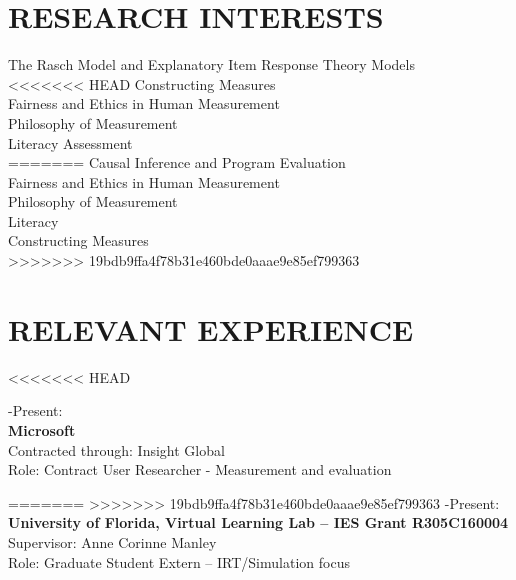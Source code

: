 \documentclass[12pt, oneside,]{memoir}
\begin{document}
\hypertarget{research-interests}{%
\section{RESEARCH INTERESTS}\label{research-interests}}
\noindent\hspace*{0.333em} The Rasch Model and Explanatory Item Response Theory Models\\
<<<<<<< HEAD
\hspace*{0.333em} Constructing Measures\\
\hspace*{0.333em} Fairness and Ethics in Human Measurement\\
\hspace*{0.333em} Philosophy of Measurement\\
\hspace*{0.333em} Literacy Assessment\\
=======
\hspace*{0.333em} Causal Inference and Program Evaluation\\
\hspace*{0.333em} Fairness and Ethics in Human Measurement\\
\hspace*{0.333em} Philosophy of Measurement\\
\hspace*{0.333em} Literacy\\
\hspace*{0.333em} Constructing Measures\\
>>>>>>> 19bdb9ffa4f78b31e460bde0aaae9e85ef799363
\vspace{2mm}

\hypertarget{relevant-experience}{%
\section{RELEVANT EXPERIENCE}\label{relevant-experience}}
<<<<<<< HEAD

-Present:\\
\textbf{Microsoft}\\
\hspace*{0.333em}\hspace*{0.333em} Contracted through: Insight Global\\
\hspace*{0.333em}\hspace*{0.333em} Role: Contract User Researcher - Measurement and evaluation


=======
>>>>>>> 19bdb9ffa4f78b31e460bde0aaae9e85ef799363
-Present:\\
\textbf{University of Florida, Virtual Learning Lab -- IES Grant R305C160004}\\
\hspace*{0.333em}\hspace*{0.333em} Supervisor: Anne Corinne Manley\\
\hspace*{0.333em}\hspace*{0.333em} Role: Graduate Student Extern -- IRT/Simulation focus
\end{document}
